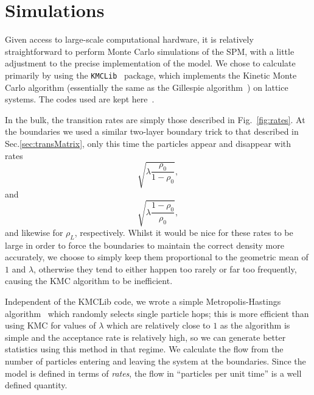 \documentclass[
reprint, amsmath,amssymb,
]{revtex4-1}
\begin{document}
\section{Simulations}
\label{sec:simulations}
Given access to large-scale computational hardware, it is relatively straightforward to perform Monte Carlo simulations of the SPM, with a little adjustment to the precise implementation of the model. 
We chose to calculate primarily by using the \texttt{KMCLib}~\cite{leetmaa2014kmclib}
package, which implements the Kinetic Monte Carlo algorithm
(essentially the same as the Gillespie algorithm~\cite{Gillespie1977,
 Bortz1975, Prados1997}) on lattice systems. The codes used are kept
here~\cite{jHellGitRepo}.

In the bulk, the transition rates are simply
those described in Fig.~\ref{fig:rates}. At the boundaries we used a similar two-layer boundary trick to that described in Sec.\ref{sec:transMatrix}, only this time the particles appear and disappear with rates
\begin{equation}
\sqrt{\lambda\frac{\rho_0}{1-\rho_0}},
\end{equation}
and
\begin{equation}
\sqrt{\lambda\frac{1-\rho_0}{\rho_0}},
\end{equation}
and likewise for $\rho_L$, respectively. Whilst it would be nice for these rates to be large in order to force the boundaries to maintain the correct density more accurately,
we choose to simply keep them proportional to the geometric mean of $1$ and $\lambda$,
otherwise they tend to either happen too rarely or far too frequently, causing the KMC algorithm to be inefficient.


Independent of the KMCLib code, we wrote a simple Metropolis-Hastings
algorithm~\cite{metHastAlg} which randomly selects single particle hops; this is more efficient than using KMC for values of
$\lambda$ which are relatively close to $1$ as the algorithm is simple and the acceptance rate is relatively high, so we can generate better statistics using this method in that regime.
We calculate the flow from the number of particles entering and
leaving the system at the boundaries.  Since the model is defined in
terms of {\it rates}, the flow in ``particles per unit time'' is a well
defined quantity.
\end{document}
